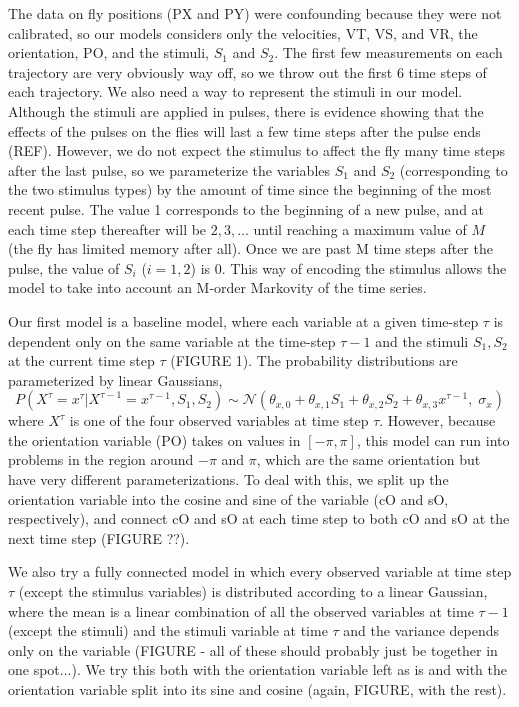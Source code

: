 \documentclass{article} %
\begin{document}
The data on fly positions (PX and PY) were confounding because they were not calibrated, so our models considers only the velocities, VT, VS, and VR, the orientation, PO, and the stimuli, $S_1$ and $S_2$. The first few measurements on each trajectory are very obviously way off, so we throw out the first 6 time steps of each trajectory. We also need a way to represent the stimuli in our model. Although the stimuli are applied in pulses, there is evidence showing that the effects of the pulses on the flies will last a few time steps after the pulse ends (REF). However, we do not expect the stimulus to affect the fly many time steps after the last pulse, so we parameterize the variables $S_1$ and $S_2$ (corresponding to the two stimulus types) by the amount of time since the beginning of the most recent pulse. The value 1 corresponds to the beginning of a new pulse, and at each time step thereafter will be $2, 3, \ldots$ until reaching a maximum value of $M$ (the fly has limited memory after all). Once we are past M time steps after the pulse, the value of $S_i$ ($i=1,2$) is $0$. This way of encoding the stimulus allows the model to take into account an M-order Markovity of the time series.

Our first model is a baseline model, where each variable at a given time-step $\tau$ is dependent only on the same variable at the time-step $\tau-1$ and the stimuli $S_1, S_2$ at the current time step $\tau$ (FIGURE 1). The probability distributions are parameterized by linear Gaussians,
$$
P(X^{\tau} = x^{\tau} | X^{\tau-1}=x^{\tau-1}, S_1, S_2) \sim \mathcal{N}\left( \theta_{x,0} + \theta_{x,1}S_1 + \theta_{x,2}S_2 + \theta_{x,3}x^{\tau-1}, \; \sigma_x \right)
$$
where $X^{\tau}$ is one of the four observed variables at time step $\tau$.
However, because the orientation variable (PO) takes on values in $[-\pi,\pi]$, this model can run into problems in the region around $-\pi$ and $\pi$, which are the same orientation but have very different parameterizations. To deal with this, we split up the orientation variable into the cosine and sine of the variable (cO and sO, respectively), and connect cO and sO at each time step to both cO and sO at the next time step (FIGURE ??).

We also try a fully connected model in which every observed variable at time step $\tau$ (except the stimulus variables) is distributed according to a linear Gaussian, where the mean is a linear combination of all the observed variables at time $\tau-1$ (except the stimuli) and the stimuli variable at time $\tau$ and the variance depends only on the variable (FIGURE - all of these should probably just be together in one spot...). We try this both with the orientation variable left as is and with the orientation variable split into its sine and cosine (again, FIGURE, with the rest).
\end{document}
